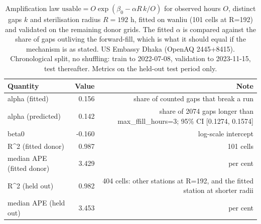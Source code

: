 \begin{table}[htbp]
\caption{Amplification law $\mathrm{usable} = O\exp(\beta_0 - \alpha R\,k/O)$ for observed hours $O$, distinct gaps $k$ and sterilisation radius $R=192$ h, fitted on wanliu (101 cells at R=192) and validated on the remaining donor grids. The fitted $\alpha$ is compared against the share of gaps outliving the forward-fill, which is what it should equal if the mechanism is as stated. US Embassy Dhaka (OpenAQ 2445+8415). Chronological split, no shuffling: train to 2022-07-08, validation to 2023-11-15, test thereafter. Metrics on the held-out test period only.}
\label{tab:missingness_law}
\begin{tabular}{lrr}
\toprule
Quantity & Value & Note \\
\midrule
alpha (fitted) & 0.156 & share of counted gaps that break a run \\
alpha (predicted) & 0.142 & share of 2074 gaps longer than max\_ffill\_hours=3; 95\% CI [0.1274, 0.1574] \\
beta0 & -0.160 & log-scale intercept \\
R\textasciicircum{}2 (fitted donor) & 0.987 & 101 cells \\
median APE (fitted donor) & 3.429 & per cent \\
R\textasciicircum{}2 (held out) & 0.982 & 404 cells: other stations at R=192, and the fitted station at shorter radii \\
median APE (held out) & 3.453 & per cent \\
\bottomrule
\end{tabular}
\end{table}
